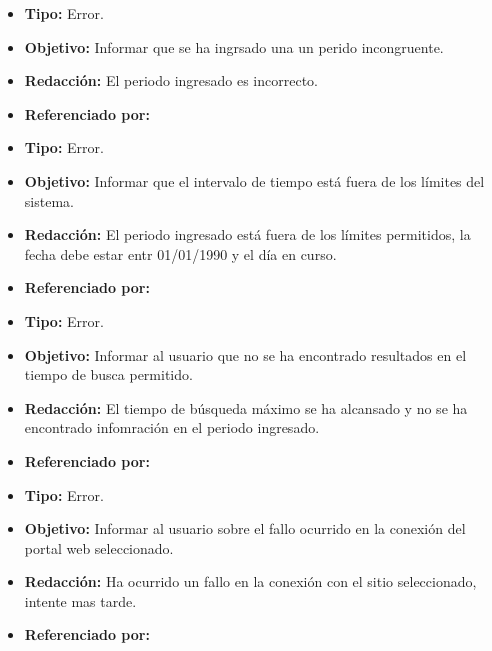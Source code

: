   \begin{itemize}
    \item \textbf{Tipo:} Error. 
    \item \textbf{Objetivo:}  Informar que se ha ingrsado una un perido incongruente.
    \item \textbf{Redacción:} El periodo ingresado es incorrecto.
    \item \textbf{Referenciado por:} \\
  \end{itemize}

  \begin{itemize}
    \item \textbf{Tipo:} Error. 
    \item \textbf{Objetivo:}  Informar que el intervalo de tiempo está fuera de los límites del sistema.
    \item \textbf{Redacción:} El periodo ingresado está fuera de los límites permitidos, la fecha debe estar entr 01/01/1990 y el día en curso.
    \item \textbf{Referenciado por:} \\
  \end{itemize}

  \begin{itemize}
    \item \textbf{Tipo:} Error. 
    \item \textbf{Objetivo:}  Informar al usuario que no se ha encontrado resultados en el tiempo de busca permitido.
    \item \textbf{Redacción:}  El tiempo de búsqueda máximo se ha alcansado y no se ha encontrado infomración en el periodo ingresado.
    \item \textbf{Referenciado por:} \\
  \end{itemize}

  \begin{itemize}
    \item \textbf{Tipo:} Error. 
    \item \textbf{Objetivo:} Informar al usuario sobre el fallo ocurrido en la conexión del portal web seleccionado.
    \item \textbf{Redacción:} Ha ocurrido un fallo en la conexión con el sitio seleccionado, intente mas tarde.
    \item \textbf{Referenciado por:} \\
  \end{itemize}


